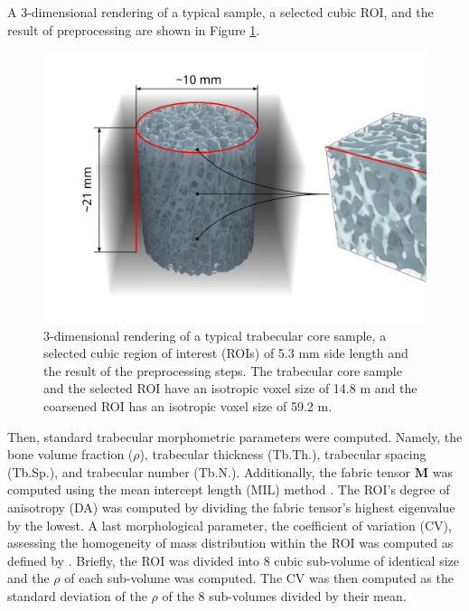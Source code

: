 \documentclass[a4paper,fleqn]{DC_ArtStyle}
\begin{document}
	A 3-dimensional rendering of a typical sample, a selected cubic ROI, and the result of preprocessing are shown in Figure \ref{FigSample}.

	\begin{figure}
		\includegraphics[width=\linewidth]{SampleNew}
		\caption{3-dimensional rendering of a typical trabecular core sample, a selected cubic region of interest (ROIs) of 5.3 mm side length and the result of the preprocessing steps.
			     The trabecular core sample and the selected ROI have an isotropic voxel size of 14.8 \textmu m and the coarsened ROI has an isotropic voxel size of 59.2 \textmu m.}
		\label{FigSample}
	\end{figure}

	Then, standard trabecular morphometric parameters were computed.
	Namely, the bone volume fraction ($\rho$), trabecular thickness (Tb.Th.), trabecular spacing (Tb.Sp.), and trabecular number (Tb.N.).
	Additionally, the fabric tensor $\mathbf{M}$ was computed using the mean intercept length (MIL) method \cite{Moreno2014}.
	The ROI's degree of anisotropy (DA) was computed by dividing the fabric tensor's highest eigenvalue by the lowest.
	A last morphological parameter, the coefficient of variation (CV), assessing the homogeneity of mass distribution within the ROI was computed as defined by \citeauthor{Panyasantisuk2015} \cite{Panyasantisuk2015}.
	Briefly, the ROI was divided into 8 cubic sub-volume of identical size and the $\rho$ of each sub-volume was computed.
	The CV was then computed as the standard deviation of the $\rho$ of the 8 sub-volumes divided by their mean.
\end{document}
